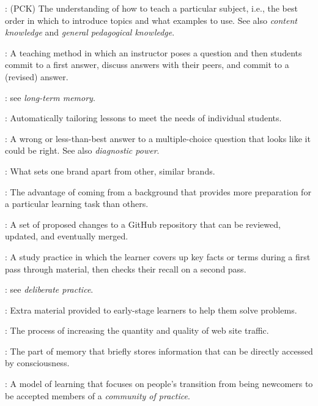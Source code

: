 \begin{description}
:
(PCK) The understanding of how to teach a particular subject, i.e., the
best order in which to introduce topics and what examples to use. See
also \emph{content knowledge} and \emph{general pedagogical knowledge}.

: A teaching method in
which an instructor poses a question and then students commit to a first
answer, discuss answers with their peers, and commit to a (revised)
answer.

: see \emph{long-term
memory}.

:
Automatically tailoring lessons to meet the needs of individual
students.

: A wrong or
less-than-best answer to a multiple-choice question that looks like it
could be right. See also \emph{diagnostic power}.

: What sets one brand apart from
other, similar brands.

: The
advantage of coming from a background that provides more preparation for
a particular learning task than others.

: A set of proposed changes to
a GitHub repository that can be reviewed, updated, and eventually
merged.

: A study
practice in which the learner covers up key facts or terms during a
first pass through material, then checks their recall on a second pass.

: see \emph{deliberate
practice}.

: Extra material provided to
early-stage learners to help them solve problems.

: The process of increasing
the quantity and quality of web site traffic.

: The part of memory
that briefly stores information that can be directly accessed by
consciousness.

: A model of learning
that focuses on people's transition from being newcomers to be accepted
members of a \emph{community of practice}.


\end{description}
